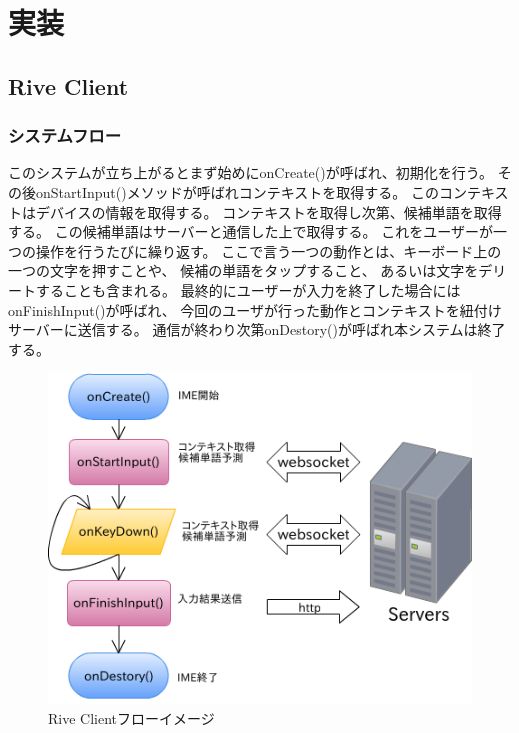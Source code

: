\chapter{実装}
\label{implementation}

\section{Rive Client}
\subsection{システムフロー}

このシステムが立ち上がるとまず始めにonCreate()が呼ばれ、初期化を行う。
その後onStartInput()メソッドが呼ばれコンテキストを取得する。
このコンテキストはデバイスの情報を取得する。
コンテキストを取得し次第、候補単語を取得する。
この候補単語はサーバーと通信した上で取得する。
これをユーザーが一つの操作を行うたびに繰り返す。
ここで言う一つの動作とは、キーボード上の一つの文字を押すことや、
候補の単語をタップすること、
あるいは文字をデリートすることも含まれる。
最終的にユーザーが入力を終了した場合にはonFinishInput()が呼ばれ、
今回のユーザが行った動作とコンテキストを紐付けサーバーに送信する。
通信が終わり次第onDestory()が呼ばれ本システムは終了する。

\begin{figure}[htbp]
  \begin{center}
    \includegraphics[width=12cm,bb=0 0 469 366]{images/clientflow}
  \end{center}
  \caption{Rive Clientフローイメージ}
  \label{fig:clientflow}
\end{figure}

